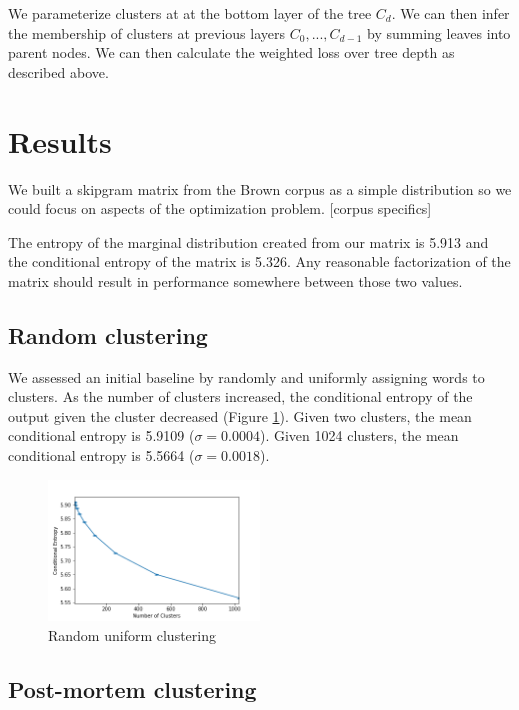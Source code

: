 \documentclass[11pt,letterpaper]{article}
\begin{document}
We parameterize clusters at at the bottom layer of the tree $C_d$. We can then infer the membership of clusters at previous layers $C_0,...,C_{d-1}$ by summing leaves into parent nodes. We can then calculate the weighted loss over tree depth as described above.

\section{Results}

We built a skipgram matrix from the Brown corpus as a simple distribution so we could focus on aspects of the optimization problem. [corpus specifics]

The entropy of the marginal distribution created from our matrix is 5.913 and the conditional entropy of the matrix is 5.326. Any reasonable factorization of the matrix should result in performance somewhere between those two values.

\subsection{Random clustering}

We assessed an initial baseline by randomly and uniformly assigning words to clusters. As the number of clusters increased, the conditional entropy of the output given the cluster decreased (Figure \ref{f:random}). Given two clusters, the mean conditional entropy is 5.9109 ($\sigma=0.0004$). Given 1024 clusters, the mean conditional entropy is 5.5664 ($\sigma=0.0018$).

\begin{figure}
  \caption{Random uniform clustering}
\label{f:random}
  \centering
    \includegraphics[width=0.5\textwidth]{random.png}
\end{figure}

\subsection{Post-mortem clustering}
\end{document}
